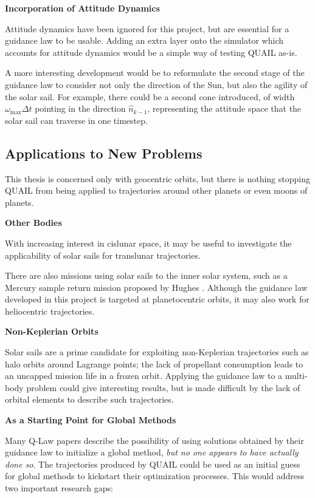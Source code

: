 \textbf{Incorporation of Attitude Dynamics}

Attitude dynamics have been ignored for this project, but are essential for a guidance law to be usable. Adding an extra layer onto the simulator which accounts for attitude dynamics would be a simple way of testing QUAIL as-is.

A more interesting development would be to reformulate the second stage of the guidance law to consider not only the direction of the Sun, but also the agility of the solar sail. For example, there could be a second cone introduced, of width \(\omega_{\text{max}} \Delta t\) pointing in the direction \(\hat{n}_{k-1}\), representing the attitude space that the solar sail can traverse in one timestep.


\subsection{Applications to New Problems}
This thesis is concerned only with geocentric orbits, but there is nothing stopping QUAIL from being applied to trajectories around other planets or even moons of planets.

\textbf{Other Bodies}

With increasing interest in cislunar space, it may be useful to investigate the applicability of solar sails for translunar trajectories.

There are also missions using solar sails to the inner solar system, such as a Mercury sample return mission proposed by Hughes \cite{hughes2006sample}. Although the guidance law developed in this project is targeted at planetocentric orbits, it may also work for heliocentric trajectories.

\textbf{Non-Keplerian Orbits}

Solar sails are a prime candidate for exploiting non-Keplerian trajectories such as halo orbits around Lagrange points; the lack of propellant consumption leads to an uncapped mission life in a frozen orbit. Applying the guidance law to a multi-body problem could give interesting results, but is made difficult by the lack of orbital elements to describe such trajectories.

\textbf{As a Starting Point for Global Methods}

Many Q-Law papers describe the possibility of using solutions obtained by their guidance law to initialize a global method, \textit{but no one appears to have actually done so}. The trajectories produced by QUAIL could be used as an initial guess for global methods to kickstart their optimization processes. This would address two important research gaps:


